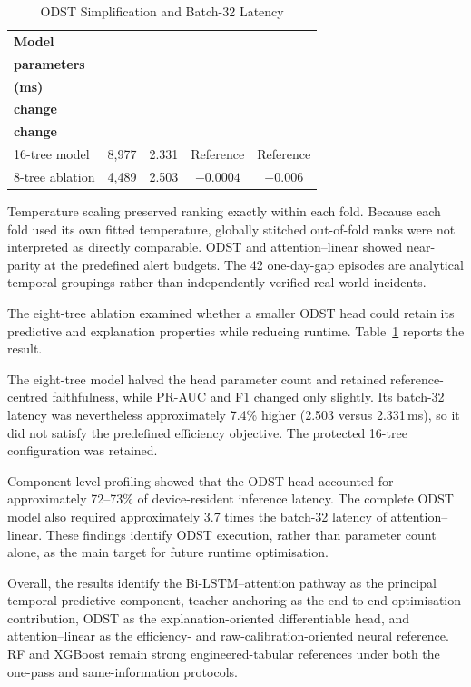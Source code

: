 \begin{table}[!t]
\caption{ODST Simplification and Batch-32 Latency}
\label{tab:odst_simplification_latency}
\centering
\footnotesize
\renewcommand{\arraystretch}{1.08}
\setlength{\tabcolsep}{0pt}
\begin{tabular*}{\columnwidth}
{@{\extracolsep{\fill}}lcccc@{}}
\hline
\textbf{Model} &
\shortstack{\textbf{Head}\\\textbf{parameters}} &
\shortstack{\textbf{Latency}\\\textbf{(ms)}} &
\shortstack{\textbf{PR-AUC}\\\textbf{change}} &
\shortstack{\textbf{F1}\\\textbf{change}} \\
\hline
16-tree model &
8,977 &
2.331 &
Reference &
Reference \\
8-tree ablation &
4,489 &
2.503 &
\(-0.0004\) &
\(-0.006\) \\
\hline
\end{tabular*}
\end{table}

Temperature scaling preserved ranking exactly within each fold. Because
each fold used its own fitted temperature, globally stitched out-of-fold
ranks were not interpreted as directly comparable. ODST and
attention--linear showed near-parity at the predefined alert budgets. The
42 one-day-gap episodes are analytical temporal groupings rather than
independently verified real-world incidents.

\smallskip
The eight-tree ablation examined whether a smaller ODST head could retain
its predictive and explanation properties while reducing runtime.
Table~\ref{tab:odst_simplification_latency} reports the result.

The eight-tree model halved the head parameter count and retained
reference-centred faithfulness, while PR-AUC and F1 changed only slightly.
Its batch-32 latency was nevertheless approximately 7.4\% higher (2.503
versus 2.331\,ms), so it did not satisfy the predefined efficiency
objective. The protected 16-tree configuration was retained.

\smallskip
Component-level profiling showed that the ODST head accounted for
approximately 72--73\% of device-resident inference latency. The complete
ODST model also required approximately 3.7 times the batch-32 latency of
attention--linear. These findings identify ODST execution, rather than
parameter count alone, as the main target for future runtime optimisation.

\smallskip
Overall, the results identify the Bi-LSTM--attention pathway as the
principal temporal predictive component, teacher anchoring as the
end-to-end optimisation contribution, ODST as the explanation-oriented
differentiable head, and attention--linear as the efficiency- and
raw-calibration-oriented neural reference. RF and XGBoost remain strong
engineered-tabular references under both the one-pass and same-information
protocols.